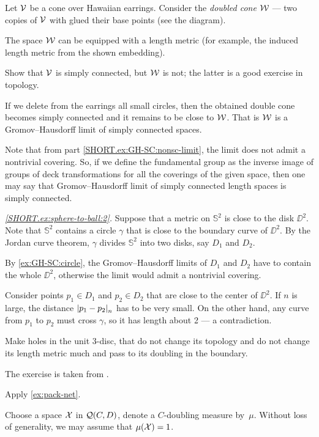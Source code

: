 Let $\mathcal{V}$ be a cone over Hawaiian earrings.
Consider the {}\emph{doubled cone} $\mathcal{W}$ --- two copies of $\mathcal{V}$ with glued their base points (see the diagram).

The space $\mathcal{W}$ can be equipped with a length metric
(for example, the induced length metric from the shown embedding).

Show that $\mathcal{V}$ is simply connected, but $\mathcal{W}$ is not; the latter is a good exercise in topology.

If we delete from the earrings all small circles, then the obtained double cone becomes simply connected and it remains to be close to $\mathcal{W}$.
That is $\mathcal{W}$ is a Gromov--Hausdorff limit of simply connected spaces.

Note that from part \ref{SHORT.ex:GH-SC:nonsc-limit}, the limit does not admit a nontrivial covering.
So, if we define the fundamental group as the inverse image of groups of deck transformations for all the coverings of the given space, then one may say that Gromov--Hausdorff limit of simply connected length spaces is simply connected.

\parbf{\ref{ex:sphere-to-ball},}
\textit{\ref{SHORT.ex:sphere-to-ball:2}.}
Suppose that a metric on $\mathbb{S}^2$ is close to the disk $\DD^2$.
Note that $\mathbb{S}^2$ contains a circle $\gamma$ that is close to the boundary curve of $\DD^2$.
By the Jordan curve theorem, $\gamma$ divides $\mathbb{S}^2$ into two disks, say $D_1$ and $D_2$.

By \ref{ex:GH-SC:circle}, the Gromov--Hausdorff limits of $D_1$ and $D_2$ have to contain the whole $\DD^2$, otherwise the limit would admit a nontrivial covering.

Consider points $p_1\in D_1$ and $p_2\in D_2$ that are close to the center of $\DD^2$.
If $n$ is large, the distance $\dist{p_1}{p_2}{n}$ has to be very small.
On the other hand, any curve from $p_1$ to $p_2$ must cross $\gamma$, so it has length about 2 --- a contradiction.

Make holes in the unit 3-disc, that do not change its topology and do not change its length metric much 
and pass to its doubling in the boundary.

 The exercise is taken from \cite{burago-burago-ivanov}.

 Apply \ref{ex:pack-net}.

Choose a space $\mathcal{X}$ in $\mathcal{Q}(C,D)$, denote a $C$-doubling measure by~$\mu$.
Without loss of generality, we may assume that $\mu(\spc{X})\z=1$.

